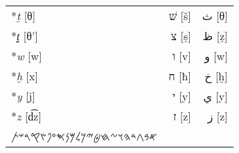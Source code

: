 \documentclass[border=0.25in]{standalone}
\begin{document}
\begin{tabular}{@{}lrr@{}}
  \**\textit{ṯ} [θ]   & \texthebrew{שׁ} [š] & \textarabic{ث} [θ]\\
  \**\textit{ṱ} [θ']  & \texthebrew{צ} [ṣ] & \textarabic{ظ} [ẓ]\\
  \**\textit{w} [w]   & \texthebrew{ו} [v] & \textarabic{و} [w]\\
  \**\textit{ḫ} [x]   & \texthebrew{ח} [ħ] & \textarabic{خ} [ḫ]\\
  \**\textit{y} [j]   & \texthebrew{י} [y] & \textarabic{ي} [y]\\
  \**\textit{z} [d͡z]  & \texthebrew{ז} [z] & \textarabic{ز} [z]\\
  {\phoenicianfont 𐤀𐤁𐤂𐤃𐤄𐤅𐤆𐤇𐤈𐤉𐤊𐤋𐤌𐤍𐤎𐤏𐤐𐤑𐤒𐤓𐤔𐤕}&& \\
  \bottomrule
\end{tabular}
\end{document}
